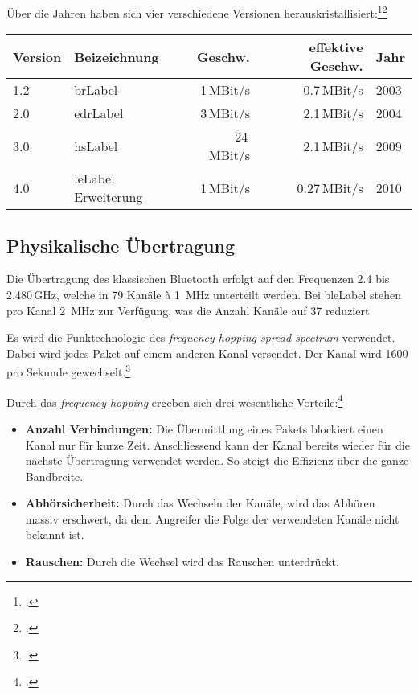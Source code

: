 Über die Jahren haben sich vier verschiedene Versionen herauskristallisiert:\footcite{Bluetooth_low_energy_Wikipedia_2015-04-17}\footcite{Our_History_Bluetooth_Technology_Website_2015-04-17}
\begin{table}[H]
\small\sffamily\renewcommand{\arraystretch}{1.4}
\begin{tabular}{llrrl}
\toprule
	Version & Beizeichnung & Geschw. & effektive Geschw.  & Jahr\\
\midrule
	1.2 & \gls{brLabel} & 1\,MBit/s & 0.7\,MBit/s & 2003 \\
	2.0 & \gls{edrLabel} & 3\,MBit/s & 2.1\,MBit/s & 2004 \\
	3.0 & \gls{hsLabel} & 24\,MBit/s & 2.1\,MBit/s & 2009\\
	4.0 & \gls{leLabel} Erweiterung & 1\,MBit/s &  0.27\,MBit/s & 2010 \\
\bottomrule
\end{tabular}
\end{table}



\subsection{Physikalische Übertragung}
Die Übertragung des klassischen Bluetooth erfolgt auf den Frequenzen 2.4 bis 2.480\,GHz, welche in 79 Kanäle à 1\, MHz unterteilt werden.
Bei \gls{bleLabel} stehen pro Kanal 2\, MHz zur Verfügung, was die Anzahl Kanäle auf 37 reduziert.

Es wird die Funktechnologie des \textit{frequency-hopping spread spectrum} verwendet.
Dabei wird jedes Paket auf einem anderen Kanal versendet.
Der Kanal wird 1\'600 pro Sekunde gewechselt.\footcite{Bluetooth_Wikipedia_2015-04-17}

Durch das \textit{frequency-hopping} ergeben sich drei wesentliche Vorteile:\footcite{Frequency-hopping_spread_spectrum_-_Wikipedia_2015-04-17}
\begin{itemize}
	\item \textbf{Anzahl Verbindungen:} Die Übermittlung eines Pakets blockiert einen Kanal nur für kurze Zeit.
		Anschliessend kann der Kanal bereits wieder für die nächste Übertragung verwendet werden.
		So steigt die Effizienz über die ganze Bandbreite.
	\item \textbf{Abhörsicherheit:} Durch das Wechseln der Kanäle, wird das Abhören massiv erschwert, da dem Angreifer die Folge der verwendeten Kanäle nicht bekannt ist.
	\item \textbf{Rauschen:} Durch die Wechsel wird das Rauschen unterdrückt.
\end{itemize}

